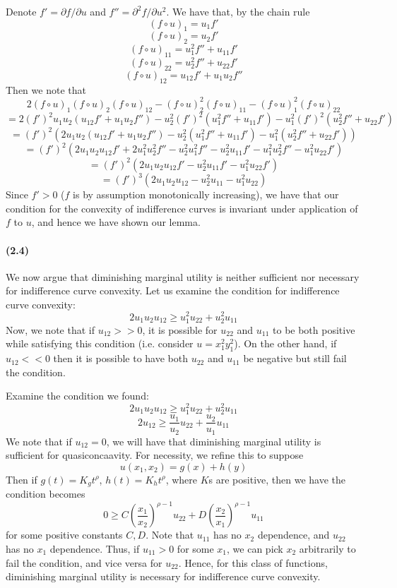 \documentclass[10pt,letter]{article}
\begin{document}
Denote $f' = \partial f/\partial u$ and $f'' = \partial^2 f/\partial u^2$. We have that, by the chain rule
\[ (f \circ u)_1 = u_1 f' \]
\[ (f \circ u)_2 = u_2 f' \]
\[ (f \circ u)_{11} = u_1^2 f'' + u_{11} f'\]
\[ (f \circ u)_{22} = u_2^2 f'' + u_{22} f'\]
\[ (f \circ u)_{12} = u_{12} f' + u_1 u_2 f''\]
Then we note that
\[ 2(f \circ u)_1(f \circ u)_2(f \circ u)_{12} - (f \circ u)_2^2(f \circ u)_{11} - (f \circ u)_1^2(f \circ u)_{22} \]
\[ = 2(f')^2u_1u_2(u_{12} f' + u_1 u_2 f'') - u_2^2 (f')^2(u_1^2 f'' + u_{11} f') - u_1^2(f')^2(u_2^2 f'' + u_{22} f') \]
\[ = (f')^2 \left( 2u_1u_2(u_{12} f' + u_1 u_2 f'') - u_2^2(u_1^2 f'' + u_{11} f') - u_1^2(u_2^2 f'' + u_{22} f') \right) \]
\[ = (f')^2 \left( 2u_1u_2u_{12} f' + 2u_1^2 u_2^2 f'' - u_2^2u_1^2 f'' - u_2^2 u_{11} f' - u_1^2u_2^2 f'' - u_1^2 u_{22} f' \right) \]
\[ = (f')^2 \left( 2u_1u_2u_{12} f'  - u_2^2 u_{11} f' - u_1^2 u_{22} f' \right) \]
\[ = (f')^3 \left( 2u_1u_2u_{12}  - u_2^2 u_{11} - u_1^2 u_{22} \right) \]
Since $f' > 0$ ($f$ is by assumption monotonically increasing), we have that our condition for the convexity of indifference curves is invariant under application of $f$ to $u$, and hence we have shown our lemma.
\paragraph{(2.4)}
We now argue that diminishing marginal utility is neither sufficient nor necessary for indifference curve convexity. Let us examine the condition for indifference curve convexity:
\[ 2u_1 u_2 u_{12} \ge u_1^2 u_{22} + u_2^2 u_{11} \]
Now, we note that if $u_{12} >> 0$, it is possible for $u_{22}$ and $u_{11}$ to be both positive while satisfying this condition (i.e. consider $u = x_1^2y_1^2$). On the other hand, if $u_{12} << 0$ then it is possible to have both $u_{22}$ and $u_{11}$ be negative but still fail the condition.

Examine the condition we found:
\[ 2u_1u_2u_{12} \ge u_1^2 u_{22} + u_2^2 u_{11}\]
\[ 2u_{12} \ge \frac{u_1}{u_2} u_{22} + \frac{u_2}{u_1}u_{11} \]
We note that if $u_{12} = 0$, we will have that diminishing marginal utility is sufficient for quasiconcaavity. For necessity, we refine this to suppose
\[ u(x_1, x_2) = g(x) + h(y)\]
Then if $g(t) = K_g t^\rho$, $h(t) = K_h t^\rho$, where $K$s are positive, then we have the condition becomes
\[ 0 \ge C\left(\frac{x_1}{x_2}\right)^{\rho - 1}u_{22} + D\left(\frac{x_2}{x_1}\right)^{\rho - 1}u_{11} \]
for some positive constants $C, D$. Note that $u_{11}$ has no $x_2$ dependence, and $u_{22}$ has no $x_1$ dependence. Thus, if $u_{11} > 0$ for some $x_1$, we can pick $x_2$ arbitrarily to fail the condition, and vice versa for $u_{22}$. Hence, for this class of functions, diminishing marginal utility is necessary for indifference curve convexity.
\end{document}
